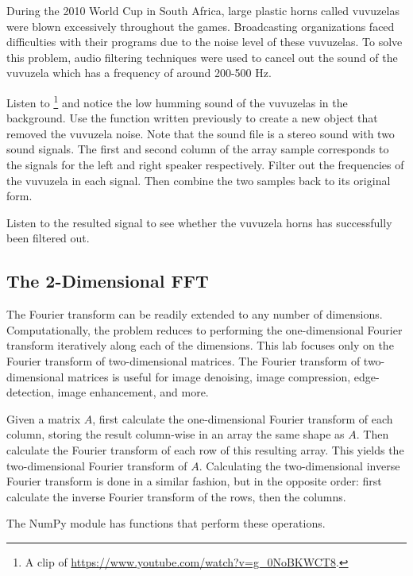 \begin{problem}
During the 2010 World Cup in South Africa, large plastic horns called vuvuzelas were blown excessively throughout the games.
Broadcasting organizations faced difficulties with their programs due to the noise level of these vuvuzelas. 
To solve this problem, audio filtering techniques were used to cancel out the sound of the vuvuzela which has a frequency of around 200-500 Hz. 

Listen to \footnote{A clip of \url{https://www.youtube.com/watch?v=g_0NoBKWCT8}.} and notice the low humming sound of the vuvuzelas in the background.  
Use the function written previously to create a new  object that removed the vuvuzela noise. 
Note that the sound file is a stereo sound with two sound signals. 
The first and second column of the array sample corresponds to the signals for the left and right speaker respectively.  
Filter out the frequencies of the vuvuzela in each signal. 
Then combine the two samples back to its original form. 

Listen to the resulted signal to see whether the vuvuzela horns has successfully been filtered out. 

\end{problem} 

\subsection*{The 2-Dimensional FFT}

The Fourier transform can be readily extended to any number of dimensions. 
Computationally, the problem reduces to performing the one-dimensional Fourier transform iteratively along each of the dimensions.
This lab focuses only on the Fourier transform of two-dimensional matrices.
The Fourier transform of two-dimensional matrices is useful for image denoising, image compression, edge-detection, image enhancement, and more.

Given a matrix $A$, first calculate the one-dimensional Fourier transform of each column, storing the result column-wise in an array the same shape as $A$.
Then calculate the Fourier transform of each row of this resulting array.
This yields the two-dimensional Fourier transform of $A$.
Calculating the two-dimensional inverse Fourier transform is done in a similar fashion, but in the opposite order: first calculate the inverse Fourier transform of the rows, then the columns. 

The NumPy module has functions that perform these operations.

